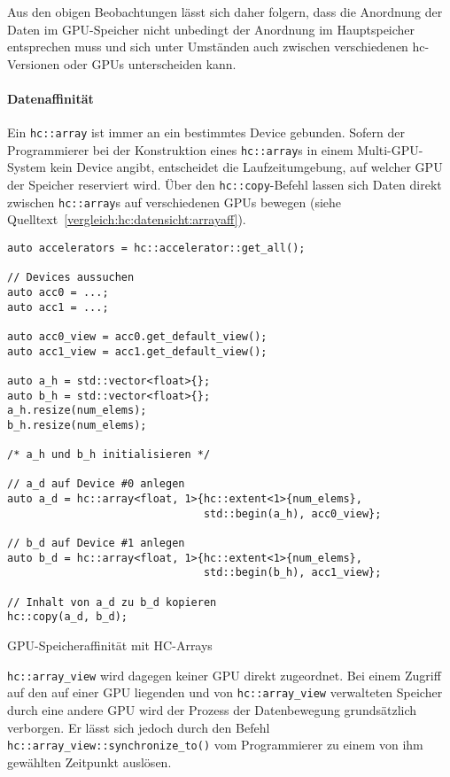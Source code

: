 Aus den obigen Beobachtungen lässt sich daher folgern, dass die Anordnung der
Daten im GPU-Speicher nicht unbedingt der Anordnung im Hauptspeicher entsprechen
muss und sich unter Umständen auch zwischen verschiedenen \gls{hc}-Versionen
oder GPUs unterscheiden kann.

\paragraph{Datenaffinität}

Ein \texttt{hc::array} ist immer an ein bestimmtes Device gebunden. Sofern der
Programmierer bei der Konstruktion eines \texttt{hc::array}s in einem
Multi-GPU-System kein Device angibt, entscheidet die Laufzeitumgebung, auf
welcher GPU der Speicher reserviert wird. Über den \texttt{hc::copy}-Befehl
lassen sich Daten direkt zwischen \texttt{hc::array}s auf verschiedenen GPUs
bewegen (siehe Quelltext~\ref{vergleich:hc:datensicht:arrayaff}).

\begin{code}
    \begin{verbatim}
auto accelerators = hc::accelerator::get_all();

// Devices aussuchen
auto acc0 = ...;
auto acc1 = ...;

auto acc0_view = acc0.get_default_view();
auto acc1_view = acc1.get_default_view();
        
auto a_h = std::vector<float>{};
auto b_h = std::vector<float>{};
a_h.resize(num_elems);
b_h.resize(num_elems);

/* a_h und b_h initialisieren */

// a_d auf Device #0 anlegen
auto a_d = hc::array<float, 1>{hc::extent<1>{num_elems},
                               std::begin(a_h), acc0_view};

// b_d auf Device #1 anlegen
auto b_d = hc::array<float, 1>{hc::extent<1>{num_elems},
                               std::begin(b_h), acc1_view};

// Inhalt von a_d zu b_d kopieren
hc::copy(a_d, b_d);
    \end{verbatim}
    \caption{GPU-Speicheraffinität mit HC-Arrays}
    \label{vergleich:hc:datensicht:arrayaff}
\end{code}


\texttt{hc::array\_view} wird dagegen keiner GPU direkt zugeordnet. Bei einem
Zugriff auf den auf einer GPU liegenden und von \texttt{hc::array\_view}
verwalteten Speicher durch eine andere GPU wird der Prozess der Datenbewegung
grundsätzlich verborgen. Er lässt sich jedoch durch den Befehl
\texttt{hc::array\_view::synchronize\_to()} vom Programmierer zu einem von ihm
gewählten Zeitpunkt auslösen.

